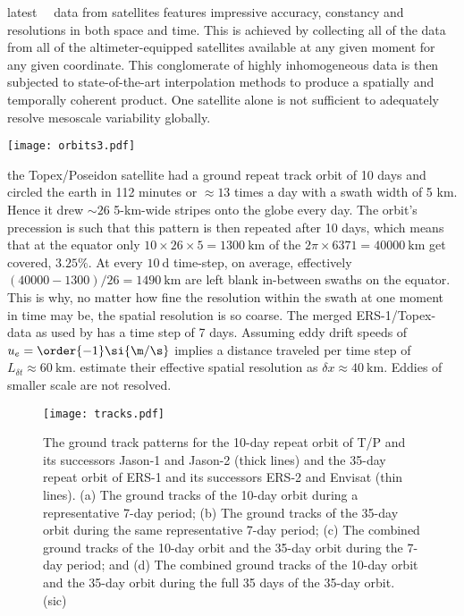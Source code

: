  latest \AVI~\SSH~data from satellites features impressive accuracy, constancy and resolutions in both space and time. This is achieved
by collecting all of the data from all of the altimeter-equipped satellites available at any given moment for any given coordinate. This conglomerate of highly
inhomogeneous data is then subjected to state-of-the-art interpolation methods to produce a spatially and temporally coherent product. One satellite alone is
not sufficient to adequately resolve mesoscale variability globally.
\begin{marginfigure}
\texttt{[image: orbits3.pdf]}
\end{marginfigure}
\Eg the Topex/Poseidon satellite had a ground repeat track orbit of 10 days and circled the earth in 112 minutes or $\approx 13$ times a day with a swath width of 5 km. Hence it drew $\sim 26$ 5-km-wide stripes onto the globe every day.
The orbit's precession is such that this pattern is then repeated after 10 days, which means that at the equator only  $10 \times 26 \times 5 = \SI{1300}{\km}$ of the $2\pi \times 6371=\SI{40000}{\km}$ get covered, \ie $3.25\%$. At every $\SI{10}{\day}$ time-step, on average, effectively $(40000-1300)/26 = \SI{1490}{\km}$ are left blank in-between swaths on the equator. This is why, no matter how fine the resolution within the swath at one moment in time may be, the spatial resolution is so coarse.
The merged ERS-1/Topex-data as used by \citet{Chelton2011} has a time step of 7 days. Assuming eddy drift speeds of $u_e= \order{-1}\si{\m/\s}$ implies a distance traveled per time step of $L_{\delta t}\approx \SI{60}{\km}$. \citeauthor{Chelton2011} estimate their effective spatial resolution as $\delta x \approx \SI{40}{\km}$. Eddies of smaller scale are not resolved.
\begin{figure}
\texttt{[image: tracks.pdf]}
\caption{{The ground track patterns for the 10-day repeat orbit of T/P and its successors Jason-1 and Jason-2 (thick lines) and the 35-day repeat orbit of ERS-1 and its successors ERS-2 and Envisat (thin lines). (a) The ground tracks of the 10-day orbit during a representative 7-day period; (b) The ground tracks of the 35-day orbit during the same representative 7-day period; (c) The combined ground tracks of the 10-day orbit and the 35-day orbit during the 7-day period; and (d) The combined ground tracks of the 10-day orbit and the 35-day orbit during the full 35 days of the 35-day orbit. (sic)} \citep{Chelton2011}}
\end{figure}

